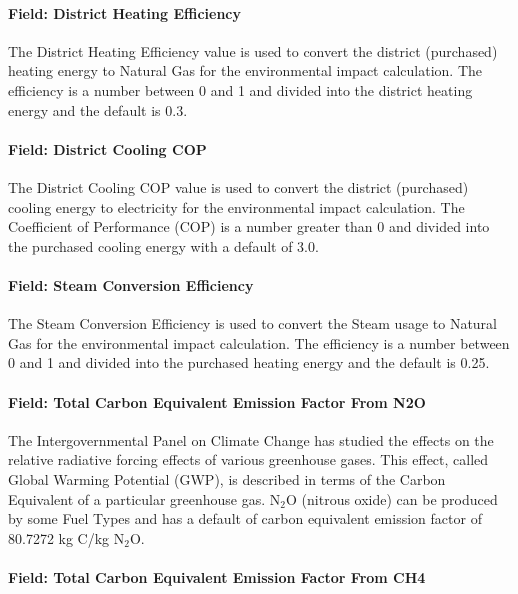 \paragraph{Field: District Heating Efficiency}\label{field-district-heating-efficiency}

The District Heating Efficiency value is used to convert the district (purchased) heating energy to Natural Gas for the environmental impact calculation. The efficiency is a number between 0 and 1 and divided into the district heating energy and the default is 0.3.

\paragraph{Field: District Cooling COP}\label{field-district-cooling-cop}

The District Cooling COP value is used to convert the district (purchased) cooling energy to electricity for the environmental impact calculation. The Coefficient of Performance (COP) is a number greater than 0 and divided into the purchased cooling energy with a default of 3.0.

\paragraph{Field: Steam Conversion Efficiency}\label{field-steam-conversion-efficiency}

The Steam Conversion Efficiency is used to convert the Steam usage to Natural Gas for the environmental impact calculation. The efficiency is a number between 0 and 1 and divided into the purchased heating energy and the default is 0.25.

\paragraph{Field: Total Carbon Equivalent Emission Factor From N2O}\label{field-total-carbon-equivalent-emission-factor-from-n2o}

The Intergovernmental Panel on Climate Change has studied the effects on the relative radiative forcing effects of various greenhouse gases. This effect, called Global Warming Potential (GWP), is described in terms of the Carbon Equivalent of a particular greenhouse gas. N\(_{2}\)O (nitrous oxide) can be produced by some Fuel Types and has a default of carbon equivalent emission factor of 80.7272 kg C/kg N\(_{2}\)O.

\paragraph{Field: Total Carbon Equivalent Emission Factor From CH4}\label{field-total-carbon-equivalent-emission-factor-from-ch4}

